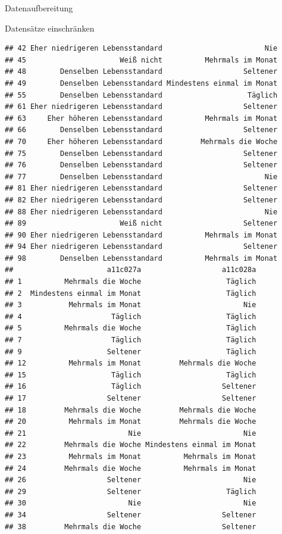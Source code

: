 \documentclass[ignorenonframetext,]{beamer}
\begin{document}
\begin{frame}[fragile]{Datenaufbereitung}
\begin{block}{Datensätze einschränken}
\begin{verbatim}
## 42 Eher niedrigeren Lebensstandard                        Nie
## 45                      Weiß nicht          Mehrmals im Monat
## 48        Denselben Lebensstandard                   Seltener
## 49        Denselben Lebensstandard Mindestens einmal im Monat
## 55        Denselben Lebensstandard                    Täglich
## 61 Eher niedrigeren Lebensstandard                   Seltener
## 63     Eher höheren Lebensstandard          Mehrmals im Monat
## 66        Denselben Lebensstandard                   Seltener
## 70     Eher höheren Lebensstandard         Mehrmals die Woche
## 75        Denselben Lebensstandard                   Seltener
## 76        Denselben Lebensstandard                   Seltener
## 77        Denselben Lebensstandard                        Nie
## 81 Eher niedrigeren Lebensstandard                   Seltener
## 82 Eher niedrigeren Lebensstandard                   Seltener
## 88 Eher niedrigeren Lebensstandard                        Nie
## 89                      Weiß nicht                   Seltener
## 90 Eher niedrigeren Lebensstandard          Mehrmals im Monat
## 94 Eher niedrigeren Lebensstandard                   Seltener
## 98        Denselben Lebensstandard          Mehrmals im Monat
##                      a11c027a                   a11c028a
## 1          Mehrmals die Woche                    Täglich
## 2  Mindestens einmal im Monat                    Täglich
## 3           Mehrmals im Monat                        Nie
## 4                     Täglich                    Täglich
## 5          Mehrmals die Woche                    Täglich
## 7                     Täglich                    Täglich
## 9                    Seltener                    Täglich
## 12          Mehrmals im Monat         Mehrmals die Woche
## 15                    Täglich                    Täglich
## 16                    Täglich                   Seltener
## 17                   Seltener                   Seltener
## 18         Mehrmals die Woche         Mehrmals die Woche
## 20          Mehrmals im Monat         Mehrmals die Woche
## 21                        Nie                        Nie
## 22         Mehrmals die Woche Mindestens einmal im Monat
## 23          Mehrmals im Monat          Mehrmals im Monat
## 24         Mehrmals die Woche          Mehrmals im Monat
## 26                   Seltener                        Nie
## 29                   Seltener                    Täglich
## 30                        Nie                        Nie
## 34                   Seltener                   Seltener
## 38         Mehrmals die Woche                   Seltener

\end{verbatim}
\end{block}
\end{frame}
\end{document}
